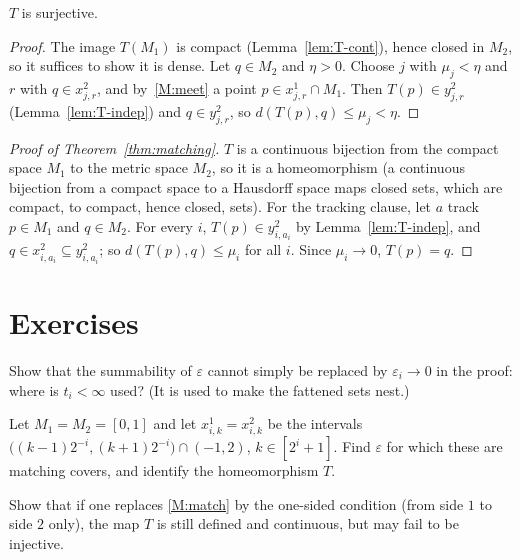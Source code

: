 
\begin{lemma}[Step 7]\label{lem:T-surj}
$T$ is surjective.
\end{lemma}

\begin{proof}
The image $T(M_1)$ is compact (Lemma~\ref{lem:T-cont}), hence closed in $M_2$, so it suffices to show it is dense. Let $q\in M_2$
and $\eta>0$. Choose $j$ with $\mu_j<\eta$ and $r$ with $q\in x^2_{j,r}$, and by~\ref{M:meet} a point $p\in x^1_{j,r}\cap M_1$.
Then $T(p)\in y^2_{j,r}$ (Lemma~\ref{lem:T-indep}) and $q\in y^2_{j,r}$, so $d(T(p),q)\le\mu_j<\eta$.
\end{proof}


\begin{proof}[Proof of Theorem~\ref{thm:matching}]
$T$ is a continuous bijection from the compact space $M_1$ to the metric space $M_2$, so it is a homeomorphism (a continuous
bijection from a compact space to a Hausdorff space maps closed sets, which are compact, to compact, hence closed, sets).
For the tracking clause, let $a$ track $p\in M_1$ and $q\in M_2$. For every $i$, $T(p)\in y^2_{i,a_i}$ by
Lemma~\ref{lem:T-indep}, and $q\in x^2_{i,a_i}\subseteq y^2_{i,a_i}$; so $d(T(p),q)\le\mu_i$ for all $i$. Since $\mu_i\to0$,
$T(p)=q$.
\end{proof}

\section*{Exercises}

\begin{exercise}
Show that the summability of $\varepsilon$ cannot simply be replaced by $\varepsilon_i\to0$ in the proof: where is
$t_i<\infty$ used? (It is used to make the fattened sets nest.)
\end{exercise}

\begin{exercise}
Let $M_1=M_2=[0,1]$ and let $x^1_{i,k}=x^2_{i,k}$ be the intervals $\bigl((k-1)2^{-i},(k+1)2^{-i}\bigr)\cap(-1,2)$,
$k\in[2^i+1]$. Find $\varepsilon$ for which these are matching covers, and identify the homeomorphism $T$.
\end{exercise}

\begin{exercise}
Show that if one replaces \ref{M:match} by the one-sided condition (from side $1$ to side $2$ only), the map $T$ is still
defined and continuous, but may fail to be injective.
\end{exercise}
